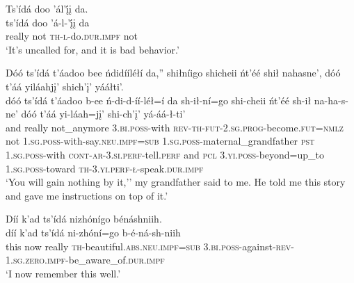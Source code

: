 \ea\label{ex:text2-24-8}
Ts’ídá doo ’ál’į́į da.\\
\gll ts’ídá	doo	’á-l-’į́į	da\\
     really	not	\textsc{th}-\textsc{l}-do.\textsc{dur}.\textsc{impf}	not\\
\glt `It's uncalled for, and it is bad behavior.'
\z

\ea\label{ex:text2-24-9}
Dóó ts’ídá t’áadoo bee ńdidííléłí da,'' shiłníigo shicheii ńt’éé shił nahasne’, dóó t’áá yiláahjį’ shich’į’ yááłti’.\\
\gll dóó	ts’ídá	t’áadoo	b-ee	ń-di-d-íí-léł=í	da	sh-ił-ní=go	shi-cheii	ńt’éé	sh-ił	na-ha-s-ne’	dóó	t’áá	yi-láah=jį’	shi-ch’į’	yá-áá-ł-ti’\\
     and	really	not\_anymore	3.\textsc{bi}.\textsc{poss}-with	\textsc{rev}-\textsc{th}-\textsc{fut}-2.\textsc{sg}.\textsc{prog}-become.\textsc{fut}=\textsc{nmlz}	not	1.\textsc{sg}.\textsc{poss}-with-say.\textsc{neu}.\textsc{impf}=\textsc{sub}	1.\textsc{sg}.\textsc{poss}-maternal\_grandfather	\textsc{pst}	1.\textsc{sg}.\textsc{poss}-with	\textsc{cont}-\textsc{ar}-3.\textsc{si}.\textsc{perf}-tell.\textsc{perf}	and	\textsc{pcl}	3.\textsc{yi}.\textsc{poss}-beyond=up\_to	1.\textsc{sg}.\textsc{poss}-toward	\textsc{th}-3.\textsc{yi}.\textsc{perf}-\textsc{ł}-speak.\textsc{dur}.\textsc{impf}\\
\glt `You will gain nothing by it,'' my grandfather said to me. He told me this story and gave me instructions on top of it.'
\z

\ea\label{ex:text2-24-10}
Díí k’ad ts’ídá nizhónígo bénáshniih.\\
\gll díí	k’ad	ts’ídá	ni-zhóní=go	b-é-ná-sh-niih\\
     this	now	really	\textsc{th}-beautiful.\textsc{abs}.\textsc{neu}.\textsc{impf}=\textsc{sub}	3.\textsc{bi}.\textsc{poss}-against-\textsc{rev}-1.\textsc{sg}.\textsc{zero}.\textsc{impf}-be\_aware\_of.\textsc{dur}.\textsc{impf}\\
\glt `I now remember this well.'
\z
